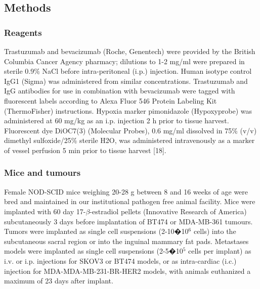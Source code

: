 \subsection{Methods}

\subsubsection{Reagents}

Trastuzumab and bevacizumab (Roche, Genentech) were provided by the British Columbia Cancer Agency pharmacy; dilutions to 1-2 mg/ml were prepared in sterile 0.9\% NaCl before intra-peritoneal (i.p.) injection.
Human isotype control IgG1 (Sigma) was administered from similar concentrations.
Trastuzumab and IgG antibodies for use in combination with bevacizumab were tagged with fluorescent labels according to Alexa Fluor 546 Protein Labeling Kit (ThermoFisher) instructions.
Hypoxia marker pimonidazole (Hypoxyprobe) was administered at 60 mg/kg as an i.p.
injection 2 h prior to tissue harvest.
Fluorescent dye DiOC7(3) (Molecular Probes), 0.6 mg/ml dissolved in 75\% (v/v) dimethyl sulfoxide/25\% sterile H2O, was administered intravenously as a marker of vessel perfusion 5 min prior to tissue harvest [18].

\subsubsection{Mice and tumours}

Female NOD-SCID mice weighing 20-28 g between 8 and 16 weeks of age were bred and maintained in our institutional pathogen free animal facility.
Mice were implanted with 60 day 17-$\beta$-estradiol pellets (Innovative Research of America) subcutaneously 3 days before implantation of BT474 or MDA-MB-361 tumours.
Tumors were implanted as single cell suspensions (2-10�10$^6$ cells) into the subcutaneous sacral region or into the inguinal mammary fat pads.
Metastases models were implanted as single cell suspensions (2-5�10$^5$ cells per implant) as i.v. or i.p. injections for SKOV3 or BT474 models, or as intra-cardiac (i.c.) injection for MDA-MDA-MB-231-BR-HER2 models, with animals euthanized a maximum of 23 days after implant.

